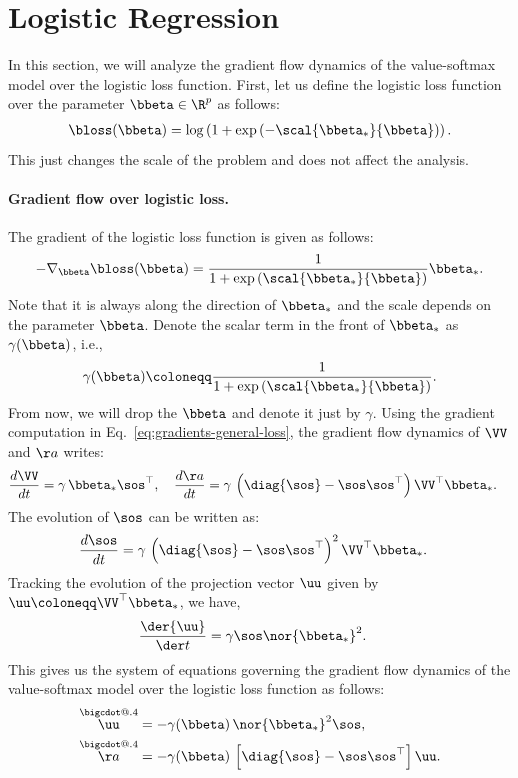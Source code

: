 \documentclass{article}
\makeatletter
\newcommand*\bigcdot{\mathpalette\bigcdot@{.4}}
\newcommand*\bigcdot@[2]{\mathbin{\vcenter{\hbox{\scalebox{#2}{$\m@th#1\bullet$}}}}}
\newcommand{\mdot}[1]{\overset{\bigcdot}{#1}}
\theoremstyle{plain}
\theoremstyle{definition}
\theoremstyle{remark}
\makeatother
\begin{document}
\section{Logistic Regression}

In this section, we will analyze the gradient flow dynamics of the value-softmax model over the logistic loss function. First, let us define the logistic loss function over the parameter $\bbeta \in \R^{p}$ as follows:
\begin{align} \label{eq:logistic_beta}
    \bloss(\bbeta) = \log \left( 1 + \exp\left( -  \scal{\bbeta_*}{\bbeta}  \right) \right).
\end{align}
This just changes the scale of the problem and does not affect the analysis. 
\paragraph{Gradient flow over logistic loss.} The gradient of the logistic loss function is given as follows:
\begin{align*}
    - \nabla_{\bbeta} \bloss(\bbeta) = \frac{1}{1 + \exp\left(  \scal{\bbeta_*}{\bbeta}  \right)} \bbeta_*.
\end{align*}
Note that it is always along the direction of $\bbeta_*$ and the scale depends on the parameter $\bbeta$.  Denote the scalar term in the front of $\bbeta_*$ as $\gamma(\bbeta)$, i.e.,
\begin{align*}
    \gamma(\bbeta) \coloneqq \frac{1}{1 + \exp\left(  \scal{\bbeta_*}{\bbeta}  \right)}.
\end{align*}
From now, we will drop the $\bbeta$ and denote it just by $\gamma$.  Using the gradient computation in Eq.~\eqref{eq:gradients-general-loss}, the gradient flow dynamics of $\VV$ and $\aa$ writes:
\begin{align*}
    \frac{d\VV}{dt} &=  \gamma \, \bbeta_* \sos^{\top},  \quad 
    \frac{d\aa}{dt} =  \gamma \, \left( \diag{\sos} - \sos \sos^{\top} \right) \VV^{\top} \bbeta_*.
\end{align*}
The evolution of $\sos$ can be written as:
\begin{align*}  
        \frac{d\sos}{dt} &=  \gamma \, \left( \diag{\sos} - \sos \sos^{\top} \right)^2 \VV^{\top} \bbeta_*.
\end{align*}
Tracking the evolution of the projection vector $\uu$ given by $\uu \coloneqq \VV^{\top} \bbeta_*$, we have,
\begin{align*}
    \frac{\der{\uu}}{\der t} &= \gamma \sos \nor{\bbeta_*}^2.
\end{align*}
This gives us the system of equations governing the gradient flow dynamics of the value-softmax model over the logistic loss function as follows:
\begin{align} 
  \mdot{\uu} &= - \gamma(\bbeta) \, \nor{\bbeta_*}^2 \sos, \\
  \mdot{\aa} &= - \gamma(\bbeta) \, \left[ \diag{\sos} - \sos \sos^{\top} \right] \uu.
\end{align}
\end{document}
